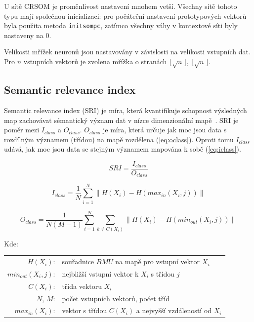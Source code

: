 \documentclass[thesis=M,czech]{FITthesis}[2012/06/26]
\begin{document}
U sítě CRSOM je proměnlivost nastavení mnohem vetší. Všechny sítě tohoto typu mají společnou inicializaci: pro počáteční nastavení prototypových vektorů byla použita metoda \texttt{initsompc}, zatímco všechny váhy v kontextové síti byly nastaveny na $0$.
\newcommand{\floor}[1]{\lfloor #1 \rfloor}

Velikosti mřížek neuronů jsou nastavovány v závislosti na velikosti vstupních dat.  Pro $n$ vstupních vektorů je zvolena mřížka o stranách $\floor{\sqrt{n}}$, $\floor{\sqrt{n}}$.




\subsection{Semantic relevance index}
Semantic relevance index (SRI) je míra, která kvantifikuje schopnost výsledných map zachovávat sémantický význam dat v nízce dimenzionální mapě~\cite{hartonomain}. SRI je poměr mezi $I_{class}$ a $O_{class}$. $O_{class}$ je míra, která určuje jak moc jsou data s rozdílným významem (třídou) na mapě rozdělena (\ref{eq:oclass}). Oproti tomu $I_{class}$ udává, jak moc jsou data se stejným významem mapována k sobě (\ref{eq:iclass}).



\vspace{\baselineskip}
\noindent
\begin{minipage}[c]{\textwidth }

\begin{equation} \label{eq:sri}
    SRI=\frac{I_{class}}{O_{class}}
\end{equation}

\begin{equation} \label{eq:oclass}
	I_{class}  = \frac{1}{N}\sum_{i=1}^{N}  \| H(X_i) - H(max_{in}(X_i, j)) \|
\end{equation}


\begin{equation} \label{eq:iclass}
	O_{class}= \frac{1}{N(M-1)}\sum_{i=1}^{N}\sum_{k \neq C(X_i)} \| H(X_i) - H(min_{out}(X_i, j)) \|
\end{equation}



Kde:\\
\hspace*{3em}
\begin{tabular}{rl}
    $H(X_i)$:&  souřadnice $BMU$ na mapě pro vstupní vektor $X_i$  \\
    $min_{out}(X_i, j)$: & nejbližší vstupní vektor k $X_i$ s třídou $j$  \\
     $C(X_i)$:& třída vektoru  $X_i$\\
     $N$, $M$:& počet vstupních vektorů, počet tříd\\
     $max_{in}(X_i)$:& vektor s třídou $C(X_i)$ a nejvyšší vzdáleností od $X_i$ \\
\end{tabular}
\end{minipage} 
\vspace{\baselineskip}
\noindent
\end{document}
